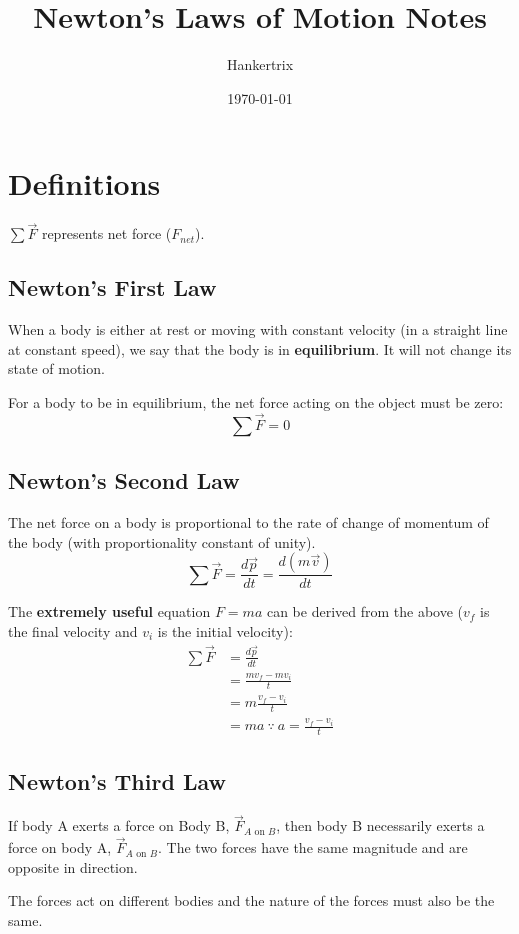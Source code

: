 \documentclass[11pt]{article}
\author{Hankertrix}
\date{\today}
\title{Newton's Laws of Motion Notes}
\begin{document}
\maketitle
\setcounter{tocdepth}{2}
\tableofcontents \clearpage\section{Definitions}
\label{sec:org33f97c0}

\(\sum \vec{F}\) represents net force (\(F_{net}\)).
\subsection{Newton's First Law}
\label{sec:org09cc0ac}
When a body is either at rest or moving with constant velocity (in a straight line at constant speed), we say that the body is in \textbf{equilibrium}. It will not change its state of motion.


For a body to be in equilibrium, the net force acting on the object must be zero:
\[\sum \vec{F} = 0\]
\subsection{Newton's Second Law}
\label{sec:orgf073d3f}
The net force on a body is proportional to the rate of change of momentum of the body (with proportionality constant of unity).
\[\sum \vec{F} = \frac{d \vec{p}}{dt} = \frac{d(m \vec{v})}{dt}\]

The \textbf{extremely useful} equation \(F = ma\) can be derived from the above (\(v_f\) is the final velocity and \(v_i\) is the initial velocity):
\begin{align*}
\sum \vec{F} &= \frac{d \vec{p}}{dt} \\
&= \frac{mv_f - mv_i}{t} \\
&= m \frac{v_f - v_i}{t} \\
&= ma \ \because \ a = \frac{v_f - v_i}{t}
\end{align*}
\subsection{Newton's Third Law}
\label{sec:orgf39f8f0}
If body A exerts a force on Body B, \(\vec{F}_{A \text{ on } B}\), then body B necessarily exerts a force on body A, \(\vec{F}_{A \text{ on } B}\). The two forces have the same magnitude and are opposite in direction.


The forces act on different bodies and the nature of the forces must also be the same.
\end{document}
